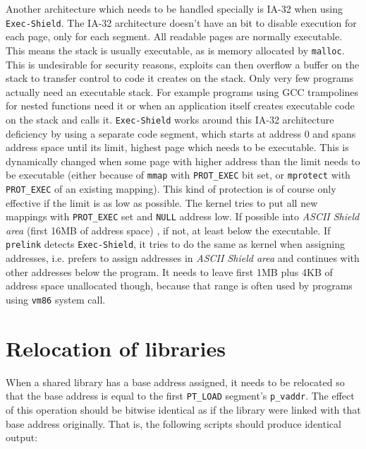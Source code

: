 \documentclass[twoside]{article}
\def\tts#1{\texttt{\small #1}}
\begin{document}
Another architecture which needs to be handled specially is IA-32
when using \tts{Exec-Shield}.  The IA-32 architecture doesn't have an
bit to disable execution for each page, only for each segment.  All readable
pages are normally executable.  This means the stack is usually executable,
as is memory allocated by \tts{malloc}.  This is undesirable for security reasons,
exploits can then overflow a buffer on the stack to transfer control
to code it creates on the stack.
Only very few programs actually need an executable stack.  For example
programs using GCC trampolines for nested functions need it or when
an application itself creates executable code on the stack and calls it.
\tts{Exec-Shield} works around this IA-32 architecture deficiency
by using a separate code segment, which starts at address 0 and spans
address space until its limit, highest page which needs to
be executable.  This is dynamically changed when some page with higher
address than the limit needs to be executable (either because of \tts{mmap}
with \tts{PROT\_EXEC} bit set, or \tts{mprotect} with \tts{PROT\_EXEC}
of an existing mapping).  This kind of protection is of course only
effective if the limit is as low as possible.  The kernel tries to
put all new mappings with \tts{PROT\_EXEC} set and \tts{NULL} address low.
If possible into {\sl ASCII Shield area} (first 16MB of address space)
, if not, at least below the executable.
If \tts{prelink} detects \tts{Exec-Shield}, it tries to do the same as
kernel when assigning addresses, i.e. prefers to assign addresses in
{\sl ASCII Shield area} and continues with other addresses below
the program.  It needs to leave first 1MB plus 4KB of address space
unallocated though, because that range is often used by programs
using \tts{vm86} system call.

\section{Relocation of libraries}

When a shared library has a base address assigned, it needs to be relocated
so that the base address is equal to the first \tts{PT\_LOAD} segment's
\tts{p\_vaddr}.  The effect of this operation should be bitwise identical
as if the library were linked with that base address originally.
That is, the following scripts should produce identical output:
\end{document}
